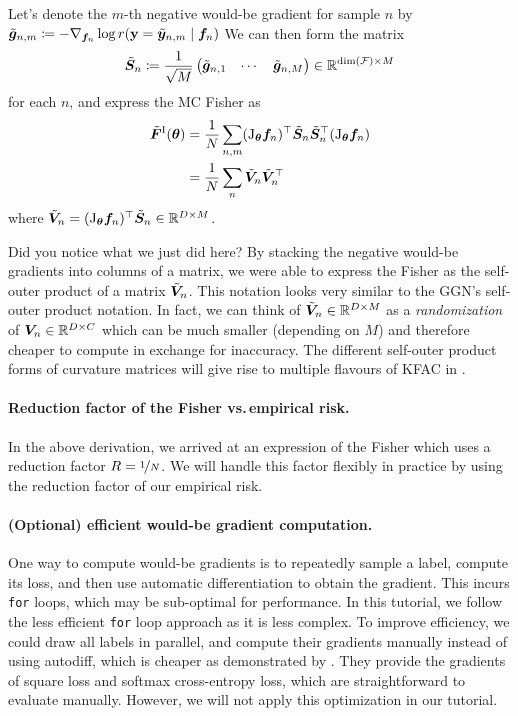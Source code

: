 Let's denote the $m$-th negative would-be gradient for sample $n$ by $\tilde{{\bm{g}}}_{n,m} \coloneq -\nabla_{{\bm{f}}_n} \log r({\mathbf{y}} = \tilde{{\bm{y}}}_{n,m} \mid {\bm{f}}_n)$
We can then form the matrix
\begin{align*}
  \tilde{{\bm{S}}}_n
  \coloneq
  \frac{1}{\sqrt{M}}
  \begin{pmatrix}
    \tilde{{\bm{g}}}_{n,1} & \cdots & \tilde{{\bm{g}}}_{n,M}
  \end{pmatrix}
  \in {\mathbb{R}}^{\dim({\mathcal{F}}) \times M}
\end{align*}
for each $n$, and express the MC Fisher as
\begin{align*}
  \tilde{{\bm{F}}}^{\text{I}}({\bm{\theta}})
  & =
    \frac{1}{N} \sum_{n,m}
    (\mathrm{J}_{{\bm{\theta}}}{\bm{f}}_n)^{\top}
    \tilde{{\bm{S}}}_n
    \tilde{{\bm{S}}}_n^{\top}
    (\mathrm{J}_{{\bm{\theta}}}{\bm{f}}_n)
  \\
  & =
    \frac{1}{N} \sum_n
    \tilde{{\bm{V}}}_n
    \tilde{{\bm{V}}}_n^{\top}
\end{align*}
where $\tilde{{\bm{V}}}_n = (\mathrm{J}_{{\bm{\theta}}}{\bm{f}}_n)^{\top} \tilde{{\bm{S}}}_n \in {\mathbb{R}}^{D \times M}$.

Did you notice what we just did here?
By stacking the negative would-be gradients into columns of a matrix, we were able to express the Fisher as the self-outer product of a matrix $\tilde{{\bm{V}}}_n$.
This notation looks very similar to the GGN's self-outer product notation.
In fact, we can think of $\tilde{{\bm{V}}}_n \in {\mathbb{R}}^{D \times M}$ as a \emph{randomization} of ${\bm{V}}_n \in {\mathbb{R}}^{D \times C}$ which can be much smaller (depending on $M$) and therefore cheaper to compute in exchange for inaccuracy.
The different self-outer product forms of curvature matrices will give rise to multiple flavours of KFAC in .

\paragraph{Reduction factor of the Fisher vs.\,empirical risk.}
In the above derivation, we arrived at an expression of the Fisher which uses a reduction factor $R = \nicefrac{1}{N}$.
We will handle this factor flexibly in practice by using the reduction factor of our empirical risk.

\paragraph{(Optional) efficient would-be gradient computation.}
One way to compute would-be gradients is to repeatedly sample a label, compute its loss, and then use automatic differentiation to obtain the gradient.
This incurs \texttt{for} loops, which may be sub-optimal for performance.
In this tutorial, we follow the less efficient \texttt{for} loop approach as it is less complex.
To improve efficiency, we could draw all labels in parallel, and compute their gradients manually instead of using autodiff, which is cheaper as demonstrated by .
They provide the gradients of square loss and softmax cross-entropy loss, which are straightforward to evaluate manually.
However, we will not apply this optimization in our tutorial.

